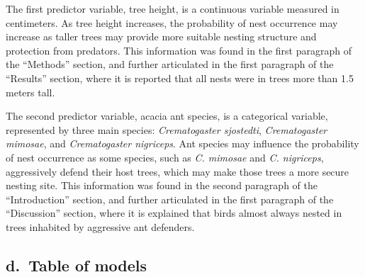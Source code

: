 \documentclass[
  letterpaper,
  DIV=11,
  numbers=noendperiod]{scrartcl}
\begin{document}
The first predictor variable, tree height, is a continuous variable
measured in centimeters. As tree height increases, the probability of
nest occurrence may increase as taller trees may provide more suitable
nesting structure and protection from predators. This information was
found in the first paragraph of the ``Methods'' section, and further
articulated in the first paragraph of the ``Results'' section, where it
is reported that all nests were in trees more than 1.5 meters tall.

The second predictor variable, acacia ant species, is a categorical
variable, represented by three main species: \emph{Crematogaster
sjostedti}, \emph{Crematogaster mimosae}, and \emph{Crematogaster
nigriceps}. Ant species may influence the probability of nest occurrence
as some species, such as \emph{C. mimosae} and \emph{C. nigriceps},
aggressively defend their host trees, which may make those trees a more
secure nesting site. This information was found in the second paragraph
of the ``Introduction'' section, and further articulated in the first
paragraph of the ``Discussion'' section, where it is explained that
birds almost always nested in trees inhabited by aggressive ant
defenders.

\subsection{\texorpdfstring{\textbf{d.~Table of
models}}{d.~Table of models}}\label{d.-table-of-models}
\end{document}
